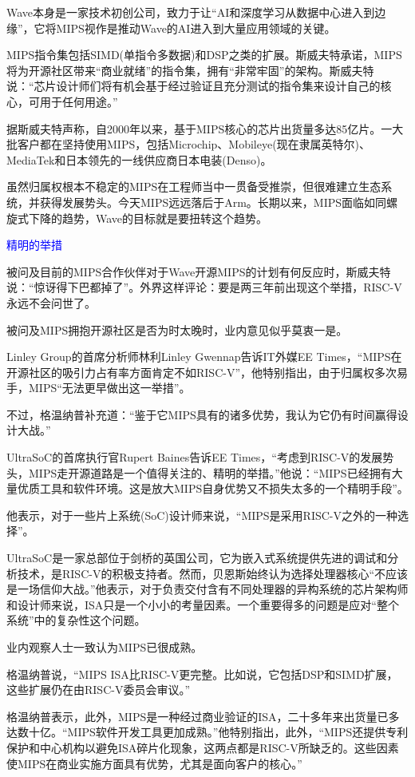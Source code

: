 \documentclass[utf8]{book}
\begin{document}
Wave本身是一家技术初创公司，致力于让“AI和深度学习从数据中心进入到边缘”，它将MIPS视作是推动Wave的AI进入到大量应用领域的关键。

MIPS指令集包括SIMD(单指令多数据)和DSP之类的扩展。斯威夫特承诺，MIPS将为开源社区带来“商业就绪”的指令集，拥有“非常牢固”的架构。斯威夫特说：“芯片设计师们将有机会基于经过验证且充分测试的指令集来设计自己的核心，可用于任何用途。”

据斯威夫特声称，自2000年以来，基于MIPS核心的芯片出货量多达85亿片。一大批客户都在坚持使用MIPS，包括Microchip、Mobileye(现在隶属英特尔)、MediaTek和日本领先的一线供应商日本电装(Denso)。

虽然归属权根本不稳定的MIPS在工程师当中一贯备受推崇，但很难建立生态系统，并获得发展势头。今天MIPS远远落后于Arm。长期以来，MIPS面临如同螺旋式下降的趋势，Wave的目标就是要扭转这个趋势。

\textcolor{blue}{精明的举措}

被问及目前的MIPS合作伙伴对于Wave开源MIPS的计划有何反应时，斯威夫特说：“惊讶得下巴都掉了”。外界这样评论：要是两三年前出现这个举措，RISC-V永远不会问世了。

被问及MIPS拥抱开源社区是否为时太晚时，业内意见似乎莫衷一是。

Linley Group的首席分析师林利Linley Gwennap告诉IT外媒EE Times，“MIPS在开源社区的吸引力占有率方面肯定不如RISC-V”，他特别指出，由于归属权多次易手，MIPS“无法更早做出这一举措”。

不过，格温纳普补充道：“鉴于它MIPS具有的诸多优势，我认为它仍有时间赢得设计大战。”

UltraSoC的首席执行官Rupert Baines告诉EE Times，“考虑到RISC-V的发展势头，MIPS走开源道路是一个值得关注的、精明的举措。”他说：“MIPS已经拥有大量优质工具和软件环境。这是放大MIPS自身优势又不损失太多的一个精明手段”。

他表示，对于一些片上系统(SoC)设计师来说，“MIPS是采用RISC-V之外的一种选择”。

UltraSoC是一家总部位于剑桥的英国公司，它为嵌入式系统提供先进的调试和分析技术，是RISC-V的积极支持者。然而，贝恩斯始终认为选择处理器核心“不应该是一场信仰大战。”他表示，对于负责交付含有不同处理器的异构系统的芯片架构师和设计师来说，ISA只是一个小小的考量因素。一个重要得多的问题是应对“整个系统”中的复杂性这个问题。

业内观察人士一致认为MIPS已很成熟。

格温纳普说，“MIPS ISA比RISC-V更完整。比如说，它包括DSP和SIMD扩展，这些扩展仍在由RISC-V委员会审议。”

格温纳普表示，此外，MIPS是一种经过商业验证的ISA，二十多年来出货量已多达数十亿。“MIPS软件开发工具更加成熟。”他特别指出，此外，“MIPS还提供专利保护和中心机构以避免ISA碎片化现象，这两点都是RISC-V所缺乏的。这些因素使MIPS在商业实施方面具有优势，尤其是面向客户的核心。”
\end{document}
